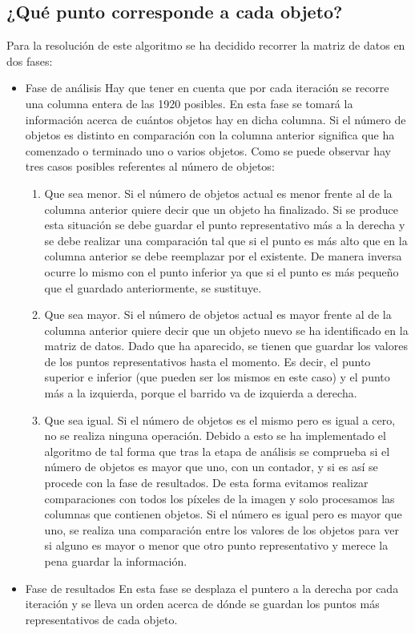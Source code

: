 \subsection{¿Qué punto corresponde a cada objeto?}

Para la resolución de este algoritmo se ha decidido recorrer la matriz de datos en dos fases:

\begin{itemize}
\item Fase de análisis
\subitem  Hay que tener en cuenta que por cada iteración se recorre una columna entera de las 1920 posibles. En esta fase se tomará la información acerca de cuántos objetos hay en dicha columna. Si el número de objetos es distinto en comparación con la columna anterior significa que ha comenzado o terminado uno o varios objetos. Como se puede observar hay tres casos posibles referentes al número de objetos:
\begin{enumerate}
\item Que sea menor. Si el número de objetos actual es menor frente al de la columna anterior quiere decir que un objeto ha finalizado. Si se produce esta situación se debe guardar el punto representativo más a la derecha y se debe realizar una comparación tal que si el punto es más alto que en la columna anterior se debe reemplazar por el existente. De manera inversa ocurre lo mismo con el punto inferior ya que si el punto es más pequeño que el guardado anteriormente, se sustituye.
\item Que sea mayor. Si el número de objetos actual es mayor frente al de la columna anterior quiere decir que un objeto nuevo se ha identificado en la matriz de datos. Dado que ha aparecido, se tienen que guardar los valores de los puntos representativos hasta el momento. Es decir, el punto superior e inferior (que pueden ser los mismos en este caso) y el punto más a la izquierda, porque el barrido va de izquierda a derecha. 
\item Que sea igual. Si el número de objetos es el mismo pero es igual a cero, no se realiza ninguna operación. Debido a esto se ha implementado el algoritmo de tal forma que tras la etapa de análisis se comprueba si el número de objetos es mayor que uno, con un contador, y si es así se procede con la fase de resultados. De esta forma evitamos realizar comparaciones con todos los píxeles de la imagen y solo procesamos las columnas que contienen objetos. Si el número es igual pero es mayor que uno, se realiza una comparación entre los valores de los objetos para ver si alguno es mayor o menor que otro punto representativo y merece la pena guardar la información.
\end{enumerate}
\item Fase de resultados
\subitem En esta fase se desplaza el puntero a la derecha por cada iteración y se lleva un orden acerca de dónde se guardan los puntos más representativos de cada objeto.
\end{itemize}

